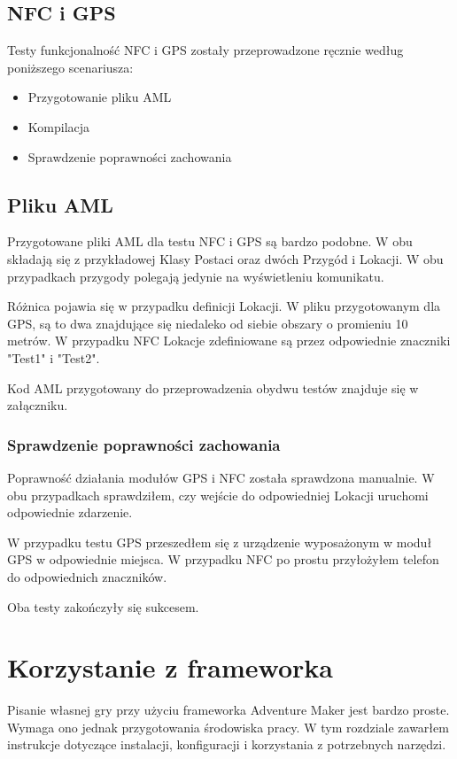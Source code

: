\documentclass	{xmgr}
\begin{document}
\section{NFC i GPS}

Testy funkcjonalność NFC i GPS zostały przeprowadzone ręcznie według poniższego scenariusza:

\begin{itemize}
  \item Przygotowanie pliku AML
  \item Kompilacja
  \item Sprawdzenie poprawności zachowania
\end{itemize}

\section{Pliku AML}

Przygotowane pliki AML dla testu NFC i GPS są bardzo podobne. W obu składają się z przykładowej Klasy Postaci oraz dwóch Przygód i Lokacji. W obu przypadkach przygody polegają jedynie na wyświetleniu komunikatu. 

Różnica pojawia się w przypadku definicji Lokacji. W pliku przygotowanym dla GPS, są to dwa znajdujące się niedaleko od siebie obszary o promieniu 10 metrów. W przypadku NFC Lokacje zdefiniowane są przez odpowiednie znaczniki "Test1" i "Test2".

Kod AML przygotowany do przeprowadzenia obydwu testów znajduje się w załączniku.

\subsection{Sprawdzenie poprawności zachowania}

Poprawność działania modułów GPS i NFC została sprawdzona manualnie. W obu przypadkach sprawdziłem, czy wejście do odpowiedniej Lokacji uruchomi odpowiednie zdarzenie.

W przypadku testu GPS przeszedłem się z urządzenie wyposażonym w moduł GPS w odpowiednie miejsca. W przypadku NFC po prostu przyłożyłem telefon do odpowiednich znaczników. 

Oba testy zakończyły się sukcesem.  

\chapter{Korzystanie z frameworka}
Pisanie własnej gry przy użyciu frameworka Adventure Maker jest bardzo proste. Wymaga ono jednak przygotowania środowiska pracy. W tym rozdziale zawarłem instrukcje dotyczące instalacji, konfiguracji i korzystania z potrzebnych narzędzi. 
\end{document}
